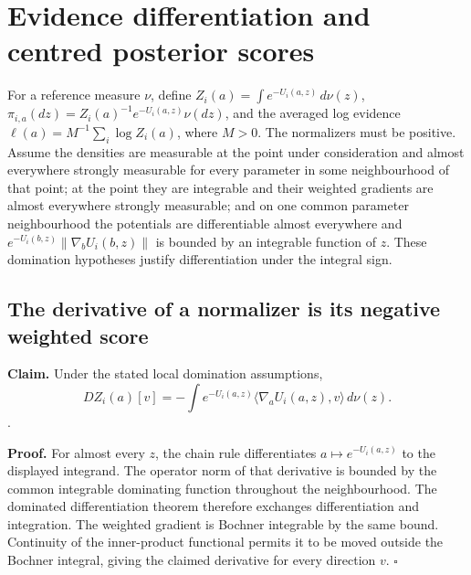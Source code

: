 \documentclass[11pt,a4paper]{report}
\begin{document}
\section{\texorpdfstring{Evidence differentiation and centred posterior scores}{Evidence differentiation and centred posterior scores}}


For a reference measure \(\nu\), define \(Z_i(a)=\int e^{-U_i(a,z)}\,d\nu(z)\), \(\pi_{i,a}(dz)=Z_i(a)^{-1}e^{-U_i(a,z)}\nu(dz)\), and the averaged log evidence \(\ell(a)=M^{-1}\sum_i\log Z_i(a)\), where \(M>0\). The normalizers must be positive. Assume the densities are measurable at the point under consideration and almost everywhere strongly measurable for every parameter in some neighbourhood of that point; at the point they are integrable and their weighted gradients are almost everywhere strongly measurable; and on one common parameter neighbourhood the potentials are differentiable almost everywhere and \(e^{-U_i(b,z)}\|\nabla_bU_i(b,z)\|\) is bounded by an integrable function of \(z\). These domination hypotheses justify differentiation under the integral sign.

\subsection{\texorpdfstring{The derivative of a normalizer is its negative weighted score}{The derivative of a normalizer is its negative weighted score}}


\textbf{Claim.} Under the stated local domination assumptions, \[DZ_i(a)[v]=-\int e^{-U_i(a,z)}\langle\nabla_aU_i(a,z),v\rangle\,d\nu(z).\].



\textbf{Proof.} For almost every \(z\), the chain rule differentiates \(a\mapsto e^{-U_i(a,z)}\) to the displayed integrand. The operator norm of that derivative is bounded by the common integrable dominating function throughout the neighbourhood. The dominated differentiation theorem therefore exchanges differentiation and integration. The weighted gradient is Bochner integrable by the same bound. Continuity of the inner-product functional permits it to be moved outside the Bochner integral, giving the claimed derivative for every direction \(v\). \(\square\)
\end{document}
